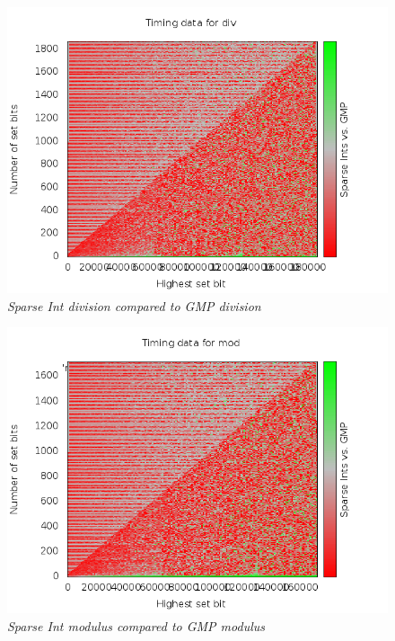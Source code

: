 \documentclass[letterpaper,11pt]{article}
\begin{document}
\begin{figure}  
\begin{center}  
\includegraphics[width=.8\textwidth]{../plots/div5num1000high3test.png}  
\caption{\small \sl Sparse Int division compared to GMP division\label{fig:Division}}  
\end{center}  
\end{figure} 

\begin{figure}  
\begin{center}  
\includegraphics[width=.8\textwidth]{../plots/mod5num1000high3test.png}  
\caption{\small \sl Sparse Int modulus compared to GMP modulus\label{fig:Modulo}}  
\end{center}  
\end{figure} 
\end{document}
